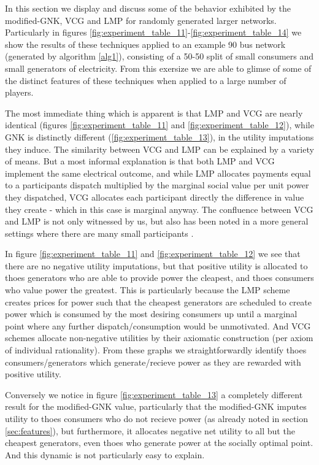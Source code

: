 In this section we display and discuss some of the behavior exhibited by the modified-GNK, VCG and LMP for randomly generated larger networks.
Particularly in figures \ref{fig:experiment_table_11}-\ref{fig:experiment_table_14} we show the results of these techniques applied to an example 90 bus network (generated by algorithm \ref{alg1}), consisting of a 50-50 split of small consumers and small generators of electricity.
From this exersize we are able to glimse of some of the distinct features of these techniques when applied to a large number of players.

The most immediate thing which is apparent is that LMP and VCG are nearly identical (figures \ref{fig:experiment_table_11} and \ref{fig:experiment_table_12}), while GNK is distinctly different (\ref{fig:experiment_table_13}), in the utility imputations they induce.
The similarity between VCG and LMP can be explained by a variety of means.
But a most informal explanation is that both LMP and VCG implement the same electrical outcome, and while LMP allocates payments equal to a participants dispatch multiplied by the marginal social value per unit power they dispatched, VCG allocates each participant directly the difference in value they create - which in this case is marginal anyway.
The confluence between VCG and LMP is not only witnessed by us, but also has been noted in a more general settings where there are many small participants \cite{NATH2019673, 8430852}.%

In figure \ref{fig:experiment_table_11} and \ref{fig:experiment_table_12} we see that there are no negative utility imputations, but that positive utility is allocated to thoes generators who are able to provide power the cleapest, and thoes consumers who value power the greatest.
This is particularly because the LMP scheme creates prices for power such that the cheapest generators are scheduled to create power which is consumed by the most desiring consumers up until a marginal point where any further dispatch/consumption would be unmotivated.
And VCG schemes allocate non-negative utilities by their axiomatic construction (per axiom of individual rationality).
From these graphs we straightforwardly identify thoes consumers/generators which generate/recieve power as they are rewarded with positive utility.

Conversely we notice in figure \ref{fig:experiment_table_13} a completely different result for the modified-GNK value, particularly that the modified-GNK imputes utility to thoes consumers who do not recieve power (as already noted in section \ref{sec:features}), but furthermore, it allocates negative net utility to all but the cheapest generators, even thoes who generate power at the socially optimal point.
And this dynamic is not particularly easy to explain.

